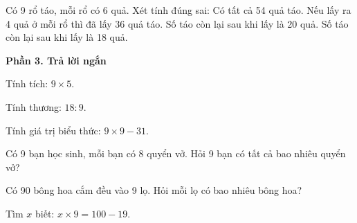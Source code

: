 \begin{ex} %
Có 9 rổ táo, mỗi rổ có 6 quả. Xét tính đúng sai:
\choiceTF
{\True Có tất cả 54 quả táo.}
{\True Nếu lấy ra 4 quả ở mỗi rổ thì đã lấy 36 quả táo.}
{Số táo còn lại sau khi lấy là 20 quả.}
{\True Số táo còn lại sau khi lấy là 18 quả.}
\end{ex}

\textbf{Phần 3. Trả lời ngắn}

\begin{ex} %
Tính tích: $9 \times 5$.
\end{ex}

\begin{ex} %
Tính thương: $18 : 9$.
\end{ex}

\begin{ex} %
Tính giá trị biểu thức: $9 \times 9 - 31$.
\end{ex}

\begin{ex} %
Có 9 bạn học sinh, mỗi bạn có 8 quyển vở. Hỏi 9 bạn có tất cả bao nhiêu quyển vở?
\end{ex}

\begin{ex} %
Có 90 bông hoa cắm đều vào 9 lọ. Hỏi mỗi lọ có bao nhiêu bông hoa?
\end{ex}

\begin{ex} %
Tìm $x$ biết: $x \times 9 = 100 - 19$.
\end{ex}
